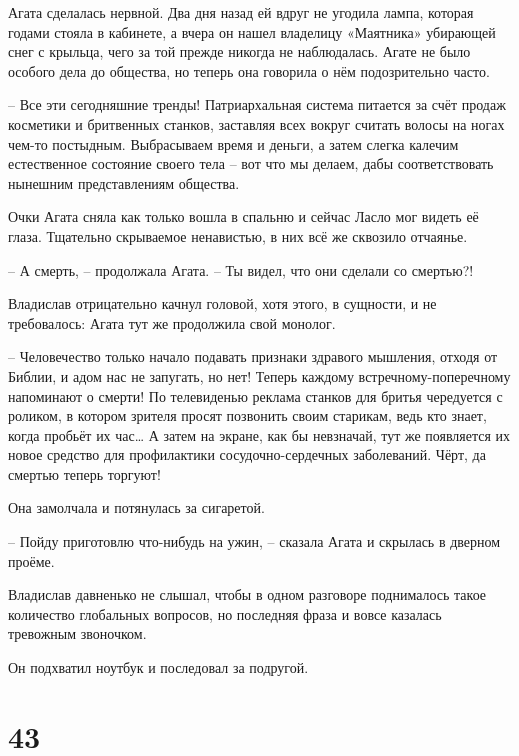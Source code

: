 \documentclass[
  a5paperpaper,
  DIV=11,
  numbers=noendperiod]{scrreprt}
\begin{document}
Агата сделалась нервной. Два дня назад ей вдруг не угодила лампа,
которая годами стояла в кабинете, а вчера он нашел владелицу «Маятника»
убирающей снег с крыльца, чего за той прежде никогда не наблюдалась.
Агате не было особого дела до общества, но теперь она говорила о нём
подозрительно часто.

-- Все эти сегодняшние тренды! Патриархальная система питается за счёт
продаж косметики и бритвенных станков, заставляя всех вокруг считать
волосы на ногах чем-то постыдным. Выбрасываем время и деньги, а затем
слегка калечим естественное состояние своего тела -- вот что мы делаем,
дабы соответствовать нынешним представлениям общества.

Очки Агата сняла как только вошла в спальню и сейчас Ласло мог видеть её
глаза. Тщательно скрываемое ненавистью, в них всё же сквозило отчаянье.

-- А смерть, -- продолжала Агата. -- Ты видел, что они сделали со
смертью?!

Владислав отрицательно качнул головой, хотя этого, в сущности, и не
требовалось: Агата тут же продолжила свой монолог.

-- Человечество только начало подавать признаки здравого мышления,
отходя от Библии, и адом нас не запугать, но нет! Теперь каждому
встречному-поперечному напоминают о смерти! По телевиденью реклама
станков для бритья чередуется с роликом, в котором зрителя просят
позвонить своим старикам, ведь кто знает, когда пробьёт их час\ldots{} А
затем на экране, как бы невзначай, тут же появляется их новое средство
для профилактики сосудочно-сердечных заболеваний. Чёрт, да смертью
теперь торгуют!

Она замолчала и потянулась за сигаретой.

-- Пойду приготовлю что-нибудь на ужин, -- сказала Агата и скрылась в
дверном проёме.

Владислав давненько не слышал, чтобы в одном разговоре поднималось такое
количество глобальных вопросов, но последняя фраза и вовсе казалась
тревожным звоночком.

Он подхватил ноутбук и последовал за подругой.

\section*{43}\label{43}

\end{document}
